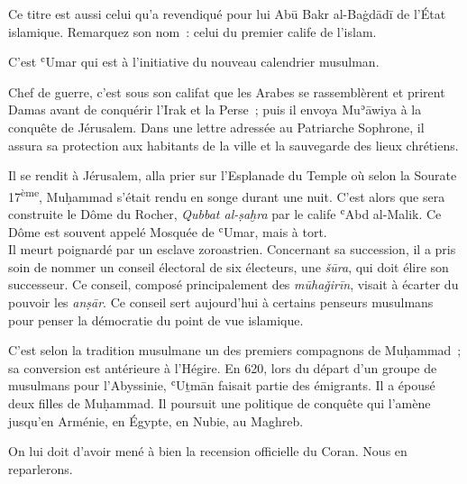 {

Ce titre est aussi celui qu'a revendiqué pour lui Abū Bakr al-Baġdādī de
l'État islamique. Remarquez son nom~: celui du premier calife de
l'islam.

C'est ʿUmar qui est à l'initiative du nouveau calendrier musulman.

Chef de guerre, c'est sous son califat que les Arabes se rassemblèrent
et prirent Damas avant de conquérir l'Irak et la Perse~; puis il envoya
Muʾāwiya à la conquête de Jérusalem. Dans une lettre adressée au
Patriarche Sophrone, il assura sa protection aux habitants de la ville
et la sauvegarde des lieux chrétiens.

Il se rendit à Jérusalem, alla prier sur l'Esplanade du Temple où selon
la Sourate 17\textsuperscript{ème}, Muḥammad s'était rendu en songe
durant une nuit. C'est alors que sera construite le Dôme du Rocher,
\emph{Qubbat al-ṣaḫra} par le calife ʿAbd al-Malik. Ce Dôme est souvent
appelé Mosquée de ʿUmar, mais à tort. \\


Il meurt poignardé par un esclave zoroastrien. Concernant sa succession,
il a pris soin de nommer un conseil électoral de six électeurs, une
\emph{šūra}, qui doit élire son successeur. Ce conseil, composé
principalement des \emph{mūhaǧirīn}, visait à écarter du pouvoir les
\emph{anṣār}. Ce conseil sert aujourd'hui à certains penseurs musulmans
pour penser la démocratie du point de vue islamique.


C'est selon la tradition musulmane un des premiers compagnons de
Muḥammad~; sa conversion est antérieure à l'Hégire. En 620, lors du
départ d'un groupe de musulmans pour l'Abyssinie, ʿUṯmān faisait partie
des émigrants. Il a épousé deux filles de Muḥammad. Il poursuit une
politique de conquête qui l'amène jusqu'en Arménie, en Égypte, en Nubie,
au Maghreb.

On lui doit d'avoir mené à bien la recension officielle du Coran. Nous
en reparlerons.

}
